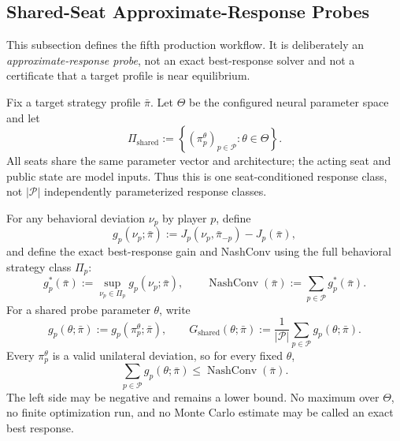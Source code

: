 \documentclass[12pt, a4paper]{article}
\begin{document}
\subsection{Shared-Seat Approximate-Response Probes}
\label{subsec:shared-seat-approximate-response}

This subsection defines the fifth production workflow.  It is deliberately an
\emph{approximate-response probe}, not an exact best-response solver and not a
certificate that a target profile is near equilibrium.

Fix a target strategy profile $\bar\pi$.  Let $\Theta$ be the configured neural
parameter space and let
\begin{equation}\label{eq:shared-response-class}
  \Pi_{\mathrm{shared}}
  :=\left\{(\pi_p^\theta)_{p\in\mathcal P}:\theta\in\Theta\right\}.
\end{equation}
All seats share the same parameter vector and architecture; the acting seat and
public state are model inputs.  Thus this is one seat-conditioned response
class, not $|\mathcal P|$ independently parameterized response classes.

For any behavioral deviation $\nu_p$ by player $p$, define
\begin{equation}\label{eq:unilateral-gain}
  g_p(\nu_p;\bar\pi)
  :=J_p(\nu_p,\bar\pi_{-p})-J_p(\bar\pi),
\end{equation}
and define the exact best-response gain and NashConv using the full behavioral
strategy class $\Pi_p$:
\begin{equation}\label{eq:exact-br-and-nashconv}
  g_p^*(\bar\pi)
  :=\sup_{\nu_p\in\Pi_p}g_p(\nu_p;\bar\pi),
  \qquad
  \operatorname{NashConv}(\bar\pi)
  :=\sum_{p\in\mathcal P}g_p^*(\bar\pi).
\end{equation}
For a shared probe parameter $\theta$, write
\begin{equation}\label{eq:shared-probe-gain-objective}
  g_p(\theta;\bar\pi):=g_p(\pi_p^\theta;\bar\pi),
  \qquad
  G_{\mathrm{shared}}(\theta;\bar\pi)
  :=\frac1{|\mathcal P|}\sum_{p\in\mathcal P}g_p(\theta;\bar\pi).
\end{equation}
Every $\pi_p^\theta$ is a valid unilateral deviation, so for every fixed
$\theta$,
\begin{equation}\label{eq:shared-probe-lower-bound}
  \sum_{p\in\mathcal P}g_p(\theta;\bar\pi)
  \leq \operatorname{NashConv}(\bar\pi).
\end{equation}
The left side may be negative and remains a lower bound.  No maximum over
$\Theta$, no finite optimization run, and no Monte Carlo estimate may be called
an exact best response.
\end{document}

